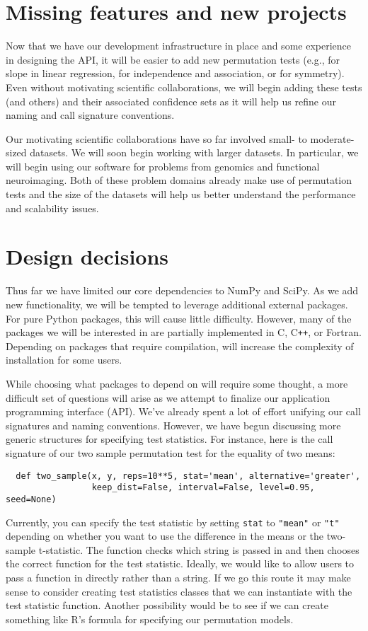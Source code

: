\section{Missing features and new projects}

Now that we have our development infrastructure in place and some experience in
designing the API, it will be easier to add new permutation tests (e.g., for
slope in linear regression, for independence and association, or for symmetry).
Even without motivating scientific collaborations, we will begin adding these
tests (and others) and their associated confidence sets as it will help us
refine our naming and call signature conventions.

Our motivating scientific collaborations have so far involved small- to
moderate-sized datasets.  We will soon begin working with larger datasets.  In
particular, we will begin using our software for problems from
genomics and functional neuroimaging.  Both of these problem domains already
make use of permutation tests and the size of the datasets will help us
better understand the performance and scalability issues.

\section{Design decisions}

Thus far we have limited our core dependencies to NumPy and SciPy.
As we add new functionality, we will be tempted to leverage additional
external packages.  For pure Python packages, this will cause little
difficulty.  However, many of the packages we will be interested in
are partially implemented in C, C{}\verb!++!, or Fortran.  Depending
on packages that require compilation, will increase the complexity
of installation for some users.

While choosing what packages to depend on will require some thought, a more
difficult set of questions will arise as we attempt to finalize our application
programming interface (API).  We've already spent a lot of effort unifying our
call signatures and naming conventions.  However, we have begun discussing more
generic structures for specifying test statistics.  For instance,
here is the call signature of our two sample permutation test for the equality
of two means: 
\begin{verbatim}
  def two_sample(x, y, reps=10**5, stat='mean', alternative='greater',
                 keep_dist=False, interval=False, level=0.95, seed=None)
\end{verbatim}
Currently, you can specify the test statistic by setting \texttt{stat} to
\texttt{"mean"} or \texttt{"t"} depending on whether you want to use the
difference in the means or the two-sample t-statistic.  The function checks
which string is passed in and then chooses the correct function for the test
statistic.  Ideally, we would like to allow users to pass a function in
directly rather than a string.  If we go this route it may make sense to
consider creating test statistics classes that we can instantiate with the test
statistic function.  Another possibility would be to see if we can create
something like R's formula for specifying our permutation models.

